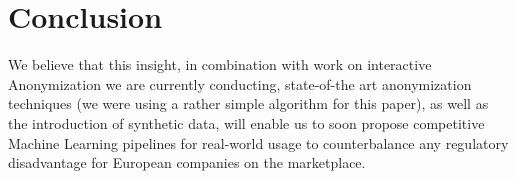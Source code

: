 \documentclass{llncs}
\begin{document}


\section{Conclusion}
\label{sect:conclusion}


We believe that this insight, in combination with work on interactive Anonymization we are currently conducting, state-of-the art anonymization techniques (we were using a rather simple algorithm for this paper), as well as the introduction of synthetic data, will enable us to soon propose competitive Machine Learning pipelines for real-world usage to counterbalance any regulatory disadvantage for European companies on the marketplace.




\end{document}
